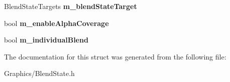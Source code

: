 \begin{DoxyCompactItemize}
\item 
\mbox{\label{structBlendStateDesc_a2cb271eff4e45f9677697aca6df59e57}} 
Blend\+State\+Targets {\bfseries m\+\_\+blend\+State\+Target}
\item 
\mbox{\label{structBlendStateDesc_adf580099064524d75beea20700e81448}} 
bool {\bfseries m\+\_\+enable\+Alpha\+Coverage}
\item 
\mbox{\label{structBlendStateDesc_a28307d90a6efd7c4348ae493ae37332d}} 
bool {\bfseries m\+\_\+individual\+Blend}
\end{DoxyCompactItemize}


The documentation for this struct was generated from the following file\+:\begin{DoxyCompactItemize}
\item 
Graphics/Blend\+State.\+h\end{DoxyCompactItemize}
